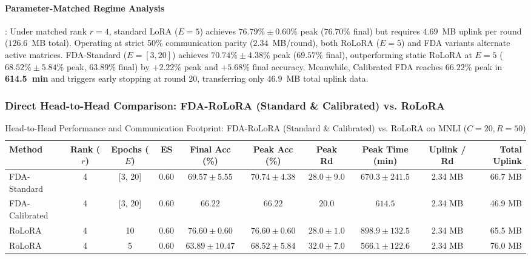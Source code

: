 \documentclass[10pt,a4paper]{article}
\begin{document}
\paragraph{Parameter-Matched Regime Analysis}:
Under matched rank $r=4$, standard LoRA ($E=5$) achieves $76.79\% \pm 0.60\%$ peak ($76.70\%$ final) but requires $4.69$~MB uplink per round ($126.6$~MB total). Operating at strict 50\% communication parity ($2.34$~MB/round), both RoLoRA ($E=5$) and FDA variants alternate active matrices. FDA-Standard ($E=[3,20]$) achieves $70.74\% \pm 4.38\%$ peak ($69.57\%$ final), outperforming static RoLoRA at $E=5$ ($68.52\% \pm 5.84\%$ peak, $63.89\%$ final) by $+2.22\%$ peak and $+5.68\%$ final accuracy. Meanwhile, Calibrated FDA reaches $66.22\%$ peak in \textbf{614.5~min} and triggers early stopping at round 20, transferring only $46.9$~MB total uplink data.

\subsubsection*{Direct Head-to-Head Comparison: FDA-RoLoRA (Standard \& Calibrated) vs. RoLoRA}
\begin{table}[H]
\centering
\caption{Head-to-Head Performance and Communication Footprint: FDA-RoLoRA (Standard \& Calibrated) vs. RoLoRA on MNLI ($C=20, R=50$)}
\label{tab:direct_mnli_c20_r50}
\scriptsize
\setlength{\tabcolsep}{1.4pt}
\begin{tabular*}{\textwidth}{@{\extracolsep{\fill}}lccccccccr@{}}
\toprule
\textbf{Method} & \textbf{Rank ($r$)} & \textbf{Epochs ($E$)} & \textbf{ES} & \textbf{Final Acc (\%)} & \textbf{Peak Acc (\%)} & \textbf{Peak Rd} & \textbf{Peak Time (min)} & \textbf{Uplink / Rd} & \textbf{Total Uplink} \\
\midrule
    FDA-Standard & 4 & [3, 20] & 0.60 & $69.57 \pm 5.55$ & $70.74 \pm 4.38$ & $28.0 \pm 9.0$ & $670.3 \pm 241.5$ & 2.34 MB & 66.7 MB \\
    FDA-Calibrated & 4 & [3, 20] & 0.60 & $66.22$ & $66.22$ & $20.0$ & $614.5$ & 2.34 MB & 46.9 MB \\
    RoLoRA & 4 & 10 & 0.60 & $76.60 \pm 0.60$ & $76.60 \pm 0.60$ & $28.0 \pm 1.0$ & $898.9 \pm 132.5$ & 2.34 MB & 65.5 MB \\
    RoLoRA & 4 & 5 & 0.60 & $63.89 \pm 10.47$ & $68.52 \pm 5.84$ & $32.0 \pm 7.0$ & $566.1 \pm 122.6$ & 2.34 MB & 76.0 MB \\
\bottomrule
\end{tabular*}
\end{table}
\end{document}
